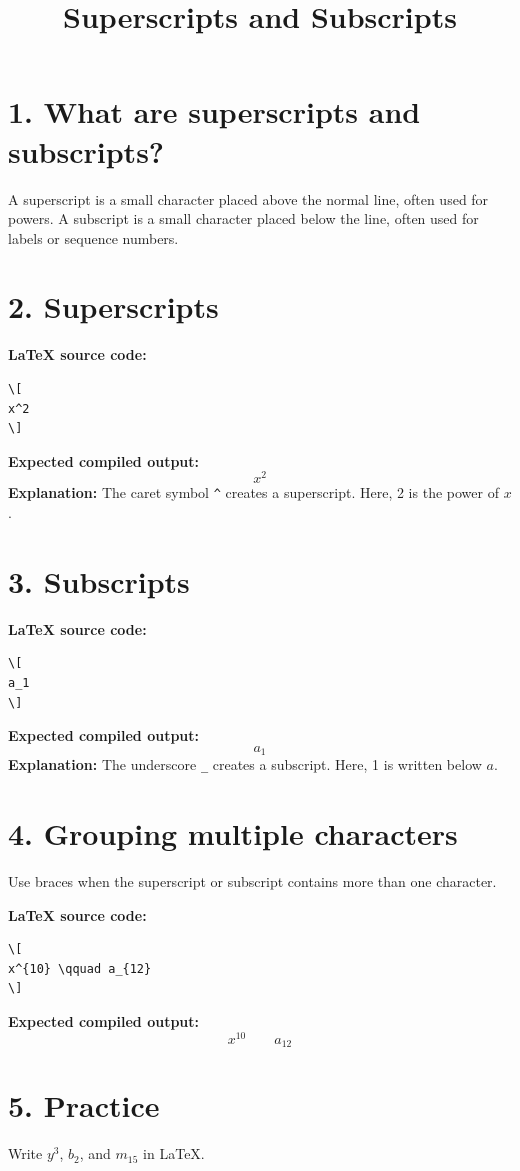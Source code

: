 \documentclass{article}
\title{Superscripts and Subscripts}
\author{ }
\date{}
\begin{document}
\maketitle

\section*{1. What are superscripts and subscripts?}
A superscript is a small character placed above the normal line, often used for powers. A subscript is a small character placed below the line, often used for labels or sequence numbers.

\section*{2. Superscripts}
\textbf{LaTeX source code:}
\begin{verbatim}
\[
x^2
\]
\end{verbatim}
\textbf{Expected compiled output:}
\[
x^2
\]
\textbf{Explanation:} The caret symbol \verb|^| creates a superscript. Here, 2 is the power of \(x\).

\section*{3. Subscripts}
\textbf{LaTeX source code:}
\begin{verbatim}
\[
a_1
\]
\end{verbatim}
\textbf{Expected compiled output:}
\[
a_1
\]
\textbf{Explanation:} The underscore \verb|_| creates a subscript. Here, 1 is written below \(a\).

\section*{4. Grouping multiple characters}
Use braces when the superscript or subscript contains more than one character.

\textbf{LaTeX source code:}
\begin{verbatim}
\[
x^{10} \qquad a_{12}
\]
\end{verbatim}
\textbf{Expected compiled output:}
\[
x^{10} \qquad a_{12}
\]

\section*{5. Practice}
Write \(y^3\), \(b_2\), and \(m_{15}\) in LaTeX.
\end{document}
